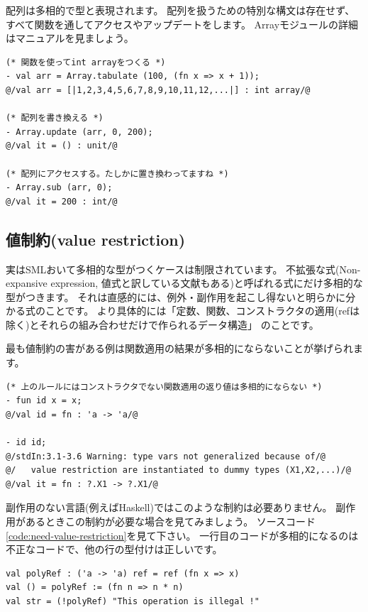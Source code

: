 \documentclass[11pt,a4paper]{article}
\begin{document}
配列は多相的で型と表現されます。
配列を扱うための特別な構文は存在せず、
すべて関数を通してアクセスやアップデートをします。
Arrayモジュールの詳細はマニュアルを見ましょう\cite{sml-libs}。

\begin{lstlisting}[caption=配列の扱い,label=code:array]
(* 関数を使ってint arrayをつくる *)
- val arr = Array.tabulate (100, (fn x => x + 1));
@/val arr = [|1,2,3,4,5,6,7,8,9,10,11,12,...|] : int array/@

(* 配列を書き換える *)
- Array.update (arr, 0, 200);
@/val it = () : unit/@

(* 配列にアクセスする。たしかに置き換わってますね *)
- Array.sub (arr, 0);
@/val it = 200 : int/@
\end{lstlisting}

\subsection{値制約(value restriction)}

実はSMLおいて多相的な型がつくケースは制限されています。
不拡張な式(Non-expansive expression, 値式と訳している文献もある)と呼ばれる式にだけ多相的な型がつきます。
それは直感的には、例外・副作用を起こし得ないと明らかに分かる式のことです。
より具体的には「定数、関数、コンストラクタの適用(refは除く)とそれらの組み合わせだけで作られるデータ構造」
のことです。

最も値制約の害がある例は関数適用の結果が多相的にならないことが挙げられます。

\begin{lstlisting}[caption=値制約,label=code:value-description]
(* 上のルールにはコンストラクタでない関数適用の返り値は多相的にならない *)
- fun id x = x;
@/val id = fn : 'a -> 'a/@

- id id;
@/stdIn:3.1-3.6 Warning: type vars not generalized because of/@
@/   value restriction are instantiated to dummy types (X1,X2,...)/@
@/val it = fn : ?.X1 -> ?.X1/@
\end{lstlisting}

副作用のない言語(例えばHaskell)ではこのような制約は必要ありません。
副作用があるときこの制約が必要な場合を見てみましょう。
ソースコード\ref{code:need-value-restriction}を見て下さい。
一行目のコードが多相的になるのは不正なコードで、他の行の型付けは正しいです。

\begin{lstlisting}[caption=値制約が必要なケース(不正なコード、動かない),label=code:need-value-restriction]
val polyRef : ('a -> 'a) ref = ref (fn x => x)
val () = polyRef := (fn n => n * n)
val str = (!polyRef) "This operation is illegal !"
\end{lstlisting}
\end{document}
